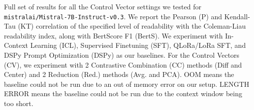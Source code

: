 \begin{table}[!ht]
\caption{Full set of results for all the Control Vector settings we tested for \texttt{mistralai/Mistral-7B-Instruct-v0.3}. We report the Pearson (P) and Kendall-Tau (KT) correlation of the specified level of readability with the Coleman-Liau readability index, along with BertScore F1 (BertS). We experiment with In-Context Learning (ICL), Supervised Finetuning (SFT), QLoRa/LoRa SFT, and DSPy Prompt Optimization (DSPy) as our baselines. For the Control Vectors (CV), we experiment with 2 Contrastive Combination (CC) methods (Diff and Center) and 2 Reduction (Red.) methods (Avg. and PCA). OOM means the baseline could not be run due to an out of memory error on our setup. LENGTH ERROR means the baseline could not be run due to the context window being too short.}
\label{tab:main-results-mistral}
\end{table}